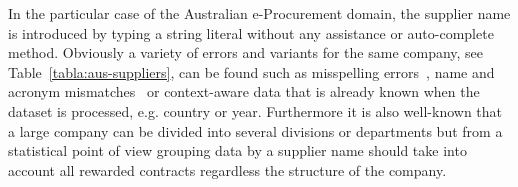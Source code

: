 \documentclass{llncs}
\begin{document}
In the particular case of the Australian e-Procurement domain, the supplier name is introduced by typing a string literal without any assistance or 
auto-complete method. Obviously a variety of errors and variants for the same company, see Table~\ref{tabla:aus-suppliers}, 
can be found such as misspelling errors~\cite{NorvigSpelling,StanfordSpelling}, name and acronym mismatches~\cite{Yeates99automaticextraction,Ratinov:2004:AES:1025132.1026366} 
or context-aware data that is already known when the dataset is processed, e.g. country or year. Furthermore it is also well-known 
that a large company can be divided into several divisions or departments but from a statistical point of view grouping data by a supplier name 
should take into account all rewarded contracts regardless the structure of the company.


\end{document}

